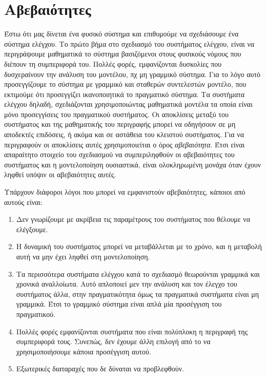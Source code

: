 \chapter{Αβεβαιότητες}\label{ch:uncert}
Έστω ότι μας δίνεται ένα φυσικό σύστημα και επιθυμούμε να σχεδιάσουμε ένα σύστημα
ελέγχου. Το πρώτο βήμα στο σχεδιασμό του συστήματος ελέγχου, είναι να περιγράψουμε
μαθηματικά το σύστημα βασιζόμενοι στους φυσικούς νόμους που διέπουν τη συμπεριφορά του.
Πολλές φορές, εμφανίζονται δυσκολίες που δυσχεραίνουν την ανάλυση του μοντέλου,
πχ μη γραμμικό σύστημα. Για το λόγο αυτό προσεγγίζουμε το σύστημα με γραμμικό και
σταθερών συντελεστών μοντέλο, που εκτιμούμε ότι προσεγγίζει ικανοποιητικά το πραγματικό
σύστημα. Τα συστήματα ελέγχου δηλαδή, σχεδιάζονται χρησιμοποιώντας μαθηματικά μοντέλα
τα οποία είναι μόνο προσεγγίσεις του πραγματικού συστήματος. Οι αποκλίσεις μεταξύ του
συστήματος και της μαθηματικής του περιγραφής μπορεί να οδηγήσουν σε μη
αποδεκτές επιδόσεις, ή ακόμα και σε αστάθεια του κλειστού συστήματος. Για να
περιγραφούν οι αποκλίσεις αυτές χρησιμοποιείται ο όρος \emph{αβεβαιότητα}.
Έτσι είναι απαραίτητο στοιχείο του σχεδιασμού να συμπεριληφθούν οι αβεβαιότητες του
συστήματος και η μοντελοποίηση ουσιαστικά, είναι ολοκληρωμένη μονάχα όταν έχουν ληφθεί
υπόψιν οι αβεβαιότητες αυτές.

Υπάρχουν διάφοροι λόγοι που μπορεί να εμφανιστούν αβεβαιότητες, κάποιοι από
αυτούς είναι:
\begin{enumerate}[label = (\enumgreek*)]
    \item Δεν γνωρίζουμε με ακρίβεια τις παραμέτρους του
        συστήματος που θέλουμε να ελέγξουμε.
    \item Η δυναμική του συστήματος μπορεί να μεταβάλλεται
        με το χρόνο, και η μεταβολή αυτή να μην έχει ληφθεί
        στη μοντελοποίηση.
    \item Τα περισσότερα συστήματα ελέγχου κατά το σχεδιασμό
        θεωρούνται γραμμικά και χρονικά αναλλοίωτα. Αυτό
        απλοποιεί μεν την ανάλυση και τον έλεγχο του συστήματος
        άλλα, στην πραγματικότητα όμως τα πραγματικά συστήματα
        είναι μη γραμμικά. Έτσι το γραμμικό σύστημα είναι απλά
        μία προσέγγιση του πραγματικού.
    \item Πολλές φορές εμφανίζονται συστήματα που είναι
        πολύπλοκη η περιγραφή της συμπεριφορά τους. Συνεπώς,
        δεν έχουμε άλλη επιλογή από το να χρησιμοποιήσουμε κάποια
        προσέγγιση αυτού.
    \item Εξωτερικές διαταραχές που δε δύναται να προβλεφθούν.
\end{enumerate}

